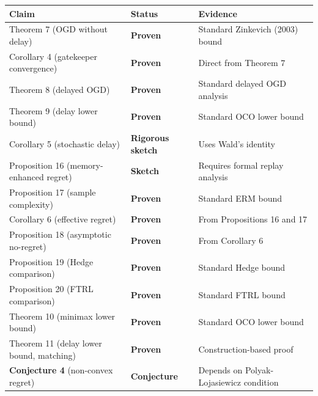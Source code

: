\documentclass[
  12pt,
]{ctexart}
\begin{document}
\begin{longtable}[]{@{}
  >{\raggedright\arraybackslash}p{}
  >{\raggedright\arraybackslash}p{}
  >{\raggedright\arraybackslash}p{}@{}}
\toprule\noalign{}
\begin{minipage}[b]{\linewidth}\raggedright
Claim
\end{minipage} & \begin{minipage}[b]{\linewidth}\raggedright
Status
\end{minipage} & \begin{minipage}[b]{\linewidth}\raggedright
Evidence
\end{minipage} \\
\midrule\noalign{}
\endhead
\bottomrule\noalign{}
\endlastfoot
Theorem 7 (OGD without delay) & \textbf{Proven} & Standard Zinkevich
(2003) bound \\
Corollary 4 (gatekeeper convergence) & \textbf{Proven} & Direct from
Theorem 7 \\
Theorem 8 (delayed OGD) & \textbf{Proven} & Standard delayed OGD
analysis \\
Theorem 9 (delay lower bound) & \textbf{Proven} & Standard OCO lower
bound \\
Corollary 5 (stochastic delay) & \textbf{Rigorous sketch} & Uses Wald's
identity \\
Proposition 16 (memory-enhanced regret) & \textbf{Sketch} & Requires
formal replay analysis \\
Proposition 17 (sample complexity) & \textbf{Proven} & Standard ERM
bound \\
Corollary 6 (effective regret) & \textbf{Proven} & From Propositions 16
and 17 \\
Proposition 18 (asymptotic no-regret) & \textbf{Proven} & From Corollary
6 \\
Proposition 19 (Hedge comparison) & \textbf{Proven} & Standard Hedge
bound \\
Proposition 20 (FTRL comparison) & \textbf{Proven} & Standard FTRL
bound \\
Theorem 10 (minimax lower bound) & \textbf{Proven} & Standard OCO lower
bound \\
Theorem 11 (delay lower bound, matching) & \textbf{Proven} &
Construction-based proof \\
\textbf{Conjecture 4} (non-convex regret) & \textbf{Conjecture} &
Depends on Polyak-Lojasiewicz condition \\
\end{longtable}
\end{document}
